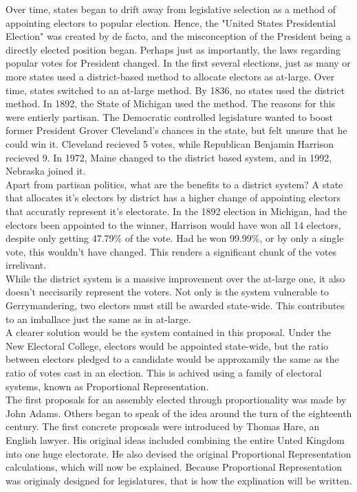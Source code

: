 \documentclass{article}
\begin{document}
    Over time, states began to drift away from legislative selection as a method of appointing electors to popular election. Hence, the "United States Presidential Election" was created by de facto, and the misconception of the President being a directly elected position began. Perhaps just as importantly, the laws regarding popular votes for President changed. In the first several elections, just as many or more states used a district-based method to allocate electors as at-large. Over time, states switched to an at-large method. By 1836, no states used the district method. In 1892, the State of Michigan used the method. The reasons for this were entierly partisan. The Democratic controlled legislature wanted to boost former President Grover Cleveland's chances in the state, but felt unsure that he could win it. Cleveland recieved 5 votes, while Republican Benjamin Harrison recieved 9. In 1972, Maine changed to the district based system, and in 1992, Nebraska joined it. \\

    Apart from partisan politics, what are the benefits to a district system? A state that allocates it's electors by district has a higher change of appointing electors that accuratly represent it's electorate. In the 1892 election in Michigan, had the electors been appointed to the winner, Harrison would have won all 14 electors, despite only getting 47.79\% of the vote. Had he won 99.99\%, or by only a single vote, this wouldn't have changed. This renders a significant chunk of the votes irrelivant. \\

    While the district system is a massive improvement over the at-large one, it also doesn't neccisarily represent the voters. Not only is the system vulnerable to Gerrymandering, two electors must still be awarded state-wide. This contributes to an imballace just the same as in at-large. \\

    A clearer solution would be the system contained in this proposal. Under the New Electoral College, electors would be appointed state-wide, but the ratio between electors pledged to a candidate would be approxamily the same as the ratio of votes cast in an election. This is achived using a family of electoral systems, known as Proportional Representation. \\

    The first proposals for an assembly elected through proportionality was made by John Adams. Others began to speak of the idea around the turn of the eighteenth century. The first concrete proposals were introduced by Thomas Hare, an English lawyer. His original ideas included combining the entire Unted Kingdom into one huge electorate. He also devised the original Proportional Representation calculations, which will now be explained. Because Proportional Representation was originaly designed for legislatures, that is how the explination will be written. \\
\end{document}
